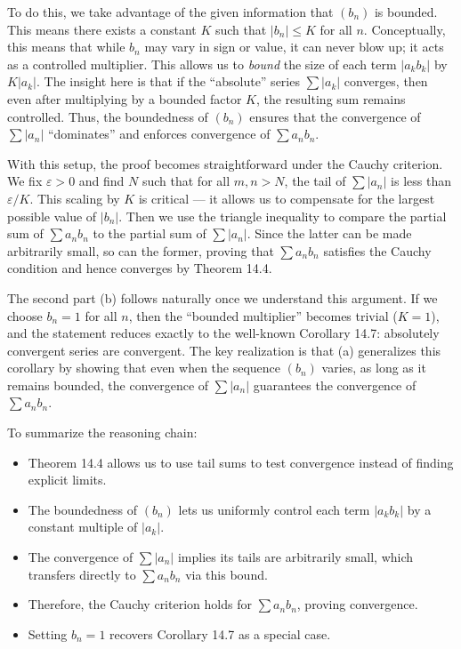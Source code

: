 \documentclass[12pt]{article}
\begin{document}
To do this, we take advantage of the given information that $(b_n)$ is bounded. This means there exists a constant $K$ such that $|b_n|\le K$ for all $n$. Conceptually, this means that while $b_n$ may vary in sign or value, it can never blow up; it acts as a controlled multiplier. This allows us to \emph{bound} the size of each term $|a_k b_k|$ by $K|a_k|$. The insight here is that if the “absolute” series $\sum |a_k|$ converges, then even after multiplying by a bounded factor $K$, the resulting sum remains controlled. Thus, the boundedness of $(b_n)$ ensures that the convergence of $\sum |a_n|$ “dominates” and enforces convergence of $\sum a_n b_n$.

With this setup, the proof becomes straightforward under the Cauchy criterion. We fix $\varepsilon > 0$ and find $N$ such that for all $m,n > N$, the tail of $\sum |a_n|$ is less than $\varepsilon/K$. This scaling by $K$ is critical — it allows us to compensate for the largest possible value of $|b_n|$. Then we use the triangle inequality to compare the partial sum of $\sum a_n b_n$ to the partial sum of $\sum |a_n|$. Since the latter can be made arbitrarily small, so can the former, proving that $\sum a_n b_n$ satisfies the Cauchy condition and hence converges by Theorem 14.4.

The second part (b) follows naturally once we understand this argument. If we choose $b_n = 1$ for all $n$, then the “bounded multiplier” becomes trivial ($K=1$), and the statement reduces exactly to the well-known Corollary 14.7: absolutely convergent series are convergent. The key realization is that (a) generalizes this corollary by showing that even when the sequence $(b_n)$ varies, as long as it remains bounded, the convergence of $\sum |a_n|$ guarantees the convergence of $\sum a_n b_n$.

To summarize the reasoning chain:
\begin{itemize}
  \item Theorem 14.4 allows us to use tail sums to test convergence instead of finding explicit limits.
  \item The boundedness of $(b_n)$ lets us uniformly control each term $|a_k b_k|$ by a constant multiple of $|a_k|$.
  \item The convergence of $\sum |a_n|$ implies its tails are arbitrarily small, which transfers directly to $\sum a_n b_n$ via this bound.
  \item Therefore, the Cauchy criterion holds for $\sum a_n b_n$, proving convergence.
  \item Setting $b_n = 1$ recovers Corollary 14.7 as a special case.
\end{itemize}
\end{document}
